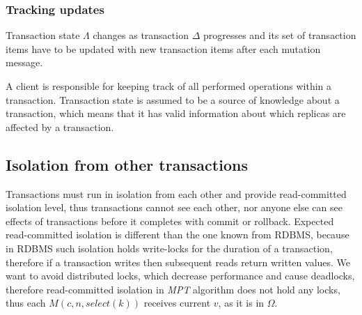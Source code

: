 \documentclass[runningheads,a4paper]{llncs}
\newcommand{\transaction}{$\Delta$\xspace}
\newcommand{\beginTransactionMessage}{$\mathit{M}(c, n, \mathit{begin\_tx}())$\xspace}
\newcommand{\initialTxStateMessage}{$\mathit{M}(n, c, \mathit{initial\_tx\_state}(\Lambda_{0}))$\xspace}
\newcommand{\selectMessage}{$\mathit{M}(c,n,select(k))$\xspace}
\newcommand{\database}{$\Omega$\xspace}
\newcommand{\txState}{$\Lambda$\xspace}
\newcommand{\mpt}{\emph{MPT}\xspace}
\begin{document}
\subsubsection{Tracking updates}

Transaction state \txState changes as transaction \transaction progresses and its set of transaction items have to be updated with new transaction items after each mutation message. 


A client is responsible for keeping track of all performed operations within a transaction. Transaction state is assumed to be a source of knowledge about a transaction, which means that it has valid information about which replicas are affected by a transaction. 

\subsection{Isolation from other transactions}
Transactions must run in isolation from each other and provide read-committed isolation level, thus transactions cannot see each other, nor anyone else can see effects of transactions before it completes with commit or rollback. Expected read-committed isolation is different than the one known from RDBMS, because in RDBMS such isolation holds write-locks for the duration of a transaction, therefore if a transaction writes then subsequent reads return written values. We want to avoid distributed locks, which decrease performance and cause deadlocks, therefore read-committed isolation in \mpt algorithm does not hold any locks, thus each \selectMessage receives current $v$, as it is in \database.
\end{document}

